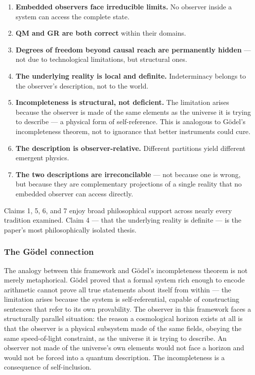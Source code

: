 \documentclass[
]{article}
\providecommand{\tightlist}{%
  \setlength{\itemsep}{0pt}\setlength{\parskip}{0pt}}
\begin{document}
\begin{enumerate}
\def\labelenumi{\arabic{enumi}.}
\tightlist
\item
  \textbf{Embedded observers face irreducible limits.} No observer
  inside a system can access the complete state.
\item
  \textbf{QM and GR are both correct} within their domains.
\item
  \textbf{Degrees of freedom beyond causal reach are permanently hidden}
  --- not due to technological limitations, but structural ones.
\item
  \textbf{The underlying reality is local and definite.} Indeterminacy
  belongs to the observer's description, not to the world.
\item
  \textbf{Incompleteness is structural, not deficient.} The limitation
  arises because the observer is made of the same elements as the
  universe it is trying to describe --- a physical form of
  self-reference. This is analogous to Gödel's incompleteness theorem,
  not to ignorance that better instruments could cure.
\item
  \textbf{The description is observer-relative.} Different partitions
  yield different emergent physics.
\item
  \textbf{The two descriptions are irreconcilable} --- not because one
  is wrong, but because they are complementary projections of a single
  reality that no embedded observer can access directly.
\end{enumerate}

Claims 1, 5, 6, and 7 enjoy broad philosophical support across nearly
every tradition examined. Claim 4 --- that the underlying reality is
definite --- is the paper's most philosophically isolated thesis.

\hypertarget{the-guxf6del-connection}{%
\subsubsection{The Gödel connection}\label{the-guxf6del-connection}}

The analogy between this framework and Gödel's incompleteness theorem is
not merely metaphorical. Gödel proved that a formal system rich enough
to encode arithmetic cannot prove all true statements about itself from
within --- the limitation arises because the system is self-referential,
capable of constructing sentences that refer to its own provability. The
observer in this framework faces a structurally parallel situation: the
reason a cosmological horizon exists at all is that the observer is a
physical subsystem made of the same fields, obeying the same
speed-of-light constraint, as the universe it is trying to describe. An
observer not made of the universe's own elements would not face a
horizon and would not be forced into a quantum description. The
incompleteness is a consequence of self-inclusion.
\end{document}
